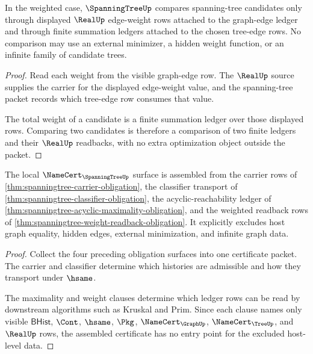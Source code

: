 \begin{theorem}
\label{thm:spanningtree-weight-readback-obligation}
In the weighted case, $\SpanningTreeUp$ compares spanning-tree candidates only through displayed $\RealUp$ edge-weight rows attached to the graph-edge ledger and through finite summation ledgers attached to the chosen tree-edge rows. No comparison may use an external minimizer, a hidden weight function, or an infinite family of candidate trees.
\end{theorem}
\begin{proof}
Read each weight from the visible graph-edge row. The $\RealUp$ source supplies the carrier for the displayed edge-weight value, and the spanning-tree packet records which tree-edge row consumes that value.

The total weight of a candidate is a finite summation ledger over those displayed rows. Comparing two candidates is therefore a comparison of two finite ledgers and their $\RealUp$ readbacks, with no extra optimization object outside the packet.
\end{proof}

\begin{theorem}
\label{thm:spanningtree-namecert-obligation-surface}
The local $\NameCert_{\SpanningTreeUp}$ surface is assembled from the carrier rows of \autoref{thm:spanningtree-carrier-obligation}, the classifier transport of \autoref{thm:spanningtree-classifier-obligation}, the acyclic-reachability ledger of \autoref{thm:spanningtree-acyclic-maximality-obligation}, and the weighted readback rows of \autoref{thm:spanningtree-weight-readback-obligation}. It explicitly excludes host graph equality, hidden edges, external minimization, and infinite graph data.
\end{theorem}
\begin{proof}
Collect the four preceding obligation surfaces into one certificate packet. The carrier and classifier determine which histories are admissible and how they transport under $\hsame$.

The maximality and weight clauses determine which ledger rows can be read by downstream algorithms such as Kruskal and Prim. Since each clause names only visible $\mathsf{BHist}$, $\Cont$, $\hsame$, $\Pkg$, $\NameCert_{\GraphUp}$, $\NameCert_{\TreeUp}$, and $\RealUp$ rows, the assembled certificate has no entry point for the excluded host-level data.
\end{proof}

